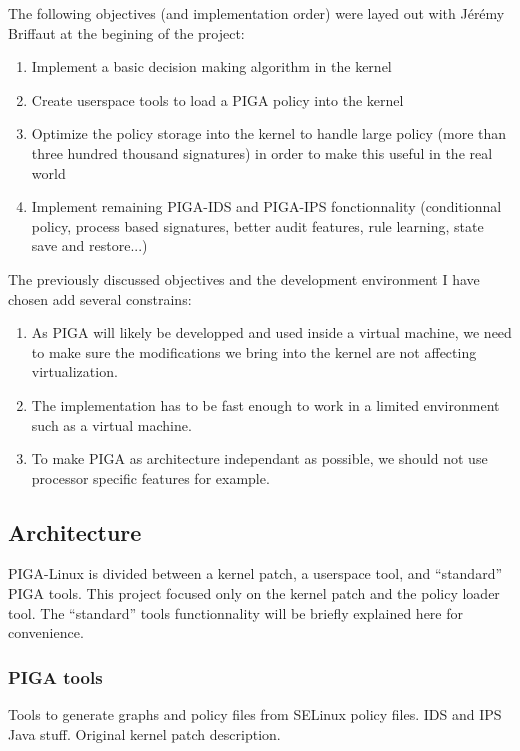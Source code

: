 \documentclass[pdftex,a4paper,titlepage,11pt]{article}
\begin{document}
The following objectives (and implementation order) were layed out with Jérémy
Briffaut at the begining of the project:

\begin{enumerate}
	\item Implement a basic decision making algorithm in the kernel
	\item Create userspace tools to load a PIGA policy into the kernel
	\item Optimize the policy storage into the kernel to handle large policy
(more than three hundred thousand signatures) in order to make this useful in
the real world
	\item Implement remaining PIGA-IDS and PIGA-IPS fonctionnality (conditionnal
policy, process based signatures, better audit features, rule learning, state
save and restore...)
\end{enumerate}

\smallskip

The previously discussed objectives and the development environment I have
chosen add several constrains:

\begin{enumerate}
	\item As PIGA will likely be developped and used inside a virtual machine,
we need to make sure the modifications we bring into the kernel are not
affecting virtualization.
	\item The implementation has to be fast enough to work in a limited
environment such as a virtual machine.
	\item To make PIGA as architecture independant as possible, we should not
use processor specific features for example.
\end{enumerate}


\subsection{Architecture}

PIGA-Linux is divided between a kernel patch, a userspace tool, and ``standard''
PIGA tools. This project focused only on the kernel patch and the policy loader
tool. The ``standard'' tools functionnality will be briefly explained here for
convenience.

\subsubsection{PIGA tools}

Tools to generate graphs and policy files from SELinux policy files. IDS and IPS
Java stuff. Original kernel patch description.
\end{document}
